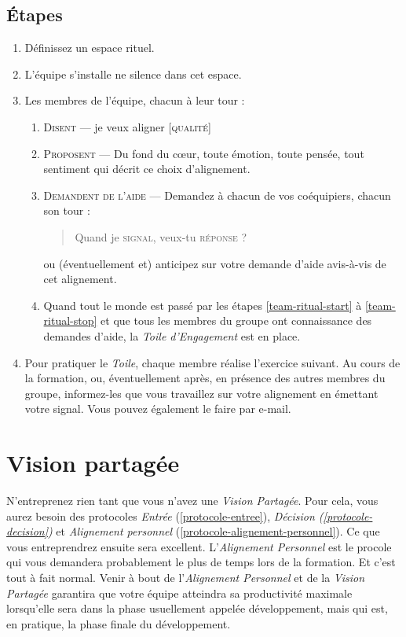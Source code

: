\documentclass[paper=6in:9in,pagesize=pdftex,headinclude=on,footinclude=on,12pt]{scrbook}
\newcommand*{\numref}[1]{{\hyperref[{#1}]{\autoref*{#1}}}}
\begin{document}
\subsection{Étapes}
\begin{enumerate}
	\item Définissez un espace rituel.
	\item L'équipe s'installe ne silence dans cet espace.
	\item Les membres de l'équipe, chacun à leur tour :
	      \begin{enumerate}
	      	\item \label{team-ritual-start} \textsc{Disent} --- \og{}je veux aligner [\textsc{qualité}]\fg{}
	      	\item \textsc{Proposent} --- Du fond du cœur, toute émotion, toute pensée, tout sentiment qui décrit ce choix d'alignement.
	      	\item \label{team-ritual-stop} \textsc{Demandent de l'aide} --- Demandez à chacun de vos coéquipiers, chacun son tour :
	      	      \begin{quote}
	      	      	\og{}Quand je \textsc{signal}, veux-tu \textsc{réponse} ?\fg{}
	      	      \end{quote}
	      	      ou (éventuellement et) anticipez sur votre demande d'aide avis-à-vis de cet alignement.
			\item Quand tout le monde est passé par les étapes \ref{team-ritual-start} à \ref{team-ritual-stop} et que tous les membres
			      du groupe ont connaissance des demandes d'aide, la \emph{Toile d'Engagement} est en place.
	      \end{enumerate}
	\item Pour pratiquer le \emph{Toile}, chaque membre réalise l'exercice suivant. Au cours de la formation, ou, éventuellement après,
	      en présence des autres membres du groupe, informez-les que vous travaillez sur votre alignement en émettant votre signal.
	      Vous pouvez également le faire par e-mail.
\end{enumerate}

\section{Vision partagée} \label{vision-partagee}

N'entreprenez rien tant que vous n'avez une \emph{Vision Partagée}. Pour cela, vous aurez besoin des protocoles \emph{Entrée}
(\numref{protocole-entree}), \emph{Décision (\numref{protocole-decision})} et \emph{Alignement personnel} (\numref{protocole-alignement-personnel}).
Ce que vous entreprendrez ensuite sera excellent. L'\emph{Alignement Personnel} est le procole qui vous demandera probablement le plus de
temps lors de la formation. Et c'est tout à fait normal. Venir à bout de l'\emph{Alignement Personnel} et de la \emph{Vision Partagée}
garantira que votre équipe atteindra sa productivité maximale lorsqu'elle sera dans la phase usuellement appelée \og{}développement\fg{},
mais qui est, en pratique, la phase finale du développement.
\end{document}
